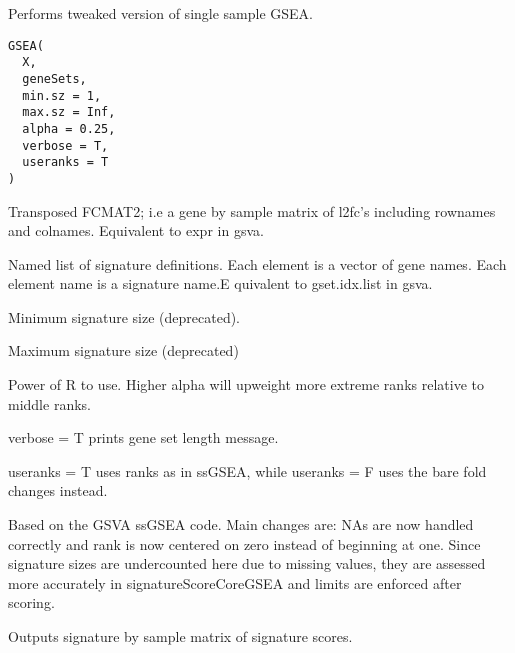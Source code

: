 \documentclass[letterpaper]{book}
\begin{document}
%
\begin{Description}\relax
Performs tweaked version of single sample GSEA.
\end{Description}
%
\begin{Usage}
\begin{verbatim}
GSEA(
  X,
  geneSets,
  min.sz = 1,
  max.sz = Inf,
  alpha = 0.25,
  verbose = T,
  useranks = T
)
\end{verbatim}
\end{Usage}
%
\begin{Arguments}
\begin{ldescription}
\item[\code{X}] Transposed FCMAT2; i.e a gene by sample matrix of l2fc's including
rownames and colnames. Equivalent to expr in gsva.

\item[\code{geneSets}] Named list of signature definitions. Each element is a vector
of gene names. Each element name is a signature name.E quivalent to
gset.idx.list in gsva.

\item[\code{min.sz}] Minimum signature size (deprecated).

\item[\code{max.sz}] Maximum signature size (deprecated)

\item[\code{alpha}] Power of R to use. Higher alpha will upweight more extreme
ranks relative to middle ranks.

\item[\code{verbose}] verbose = T prints gene set length message.

\item[\code{useranks}] useranks = T uses ranks as in ssGSEA, while useranks = F
uses the bare fold changes instead.
\end{ldescription}
\end{Arguments}
%
\begin{Details}\relax
Based on the GSVA ssGSEA code. Main changes are: NAs are now handled correctly
and rank is now centered on zero instead of beginning at one. Since signature
sizes are undercounted here due to missing values, they are
assessed more accurately in signatureScoreCoreGSEA and limits are enforced
after scoring.
\end{Details}
%
\begin{Value}
Outputs signature by sample matrix of signature scores.
\end{Value}
\end{document}
